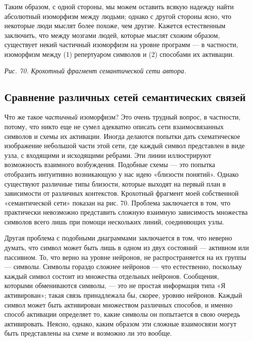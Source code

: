 \documentclass[../main.tex]{subfiles}
\begin{document}
Таким образом, с одной стороны, мы можем оставить всякую надежду найти абсолютный изоморфизм между людьми; однако с другой стороны ясно, что некоторые люди мыслят более похоже, чем другие. Кажется естественным заключить, что между мозгами людей, которые мыслят схожим образом, существует некий частичный изоморфизм на уровне программ --- в частности, изоморфизм между (1) репертуаром символов и (2) способами их активации.

\emph{Рис. 70. Крохотный фрагмент семантической сети автора.}


\subsection{Сравнение различных сетей семантических связей}

Что же такое \emph{частичный} изоморфизм? Это очень трудный вопрос, в частности, потому, что никто еще не сумел адекватно описать сети взаимосвязанных символов и схемы их активации. Иногда делаются попытки дать схематическое изображение небольшой части этой сети, где каждый символ представлен в виде узла, с входящими и исходящими ребрами. Эти линии иллюстрируют возможность взаимного возбуждения. Подобные схемы --- это попытка отобразить интуитивно возникающую у нас идею «близости понятий». Однако существуют различные типы близости, которые выходят на первый план в зависимости от различных контекстов. Крохотный фрагмент моей собственной «семантической сети» показан на рис. 70. Проблема заключается в том, что практически невозможно представить сложную взаимную зависимость множества символов всего лишь при помощи нескольких линий, соединяющих узлы.

Другая проблема с подобными диаграммами заключается в том, что неверно думать, что символ может быть лишь в одном из двух состояний --- активном или пассивном. То, что верно на уровне нейронов, не распространяется на их группы --- символы. Символы гораздо сложнее нейронов --- что естественно, поскольку каждый символ состоит из множества отдельных нейронов. Сообщения, которыми обмениваются символы, --- это не простая информация типа «Я активирован»; такая связь принадлежала бы, скорее, уровню нейронов. Каждый символ может быть активирован множеством различных способов, и именно способ активации определяет то, какие символы он попытается в свою очередь активировать. Неясно, однако, каким образом эти сложные взаимосвязи могут быть представлены на схеме и возможно ли это вообще.
\end{document}
